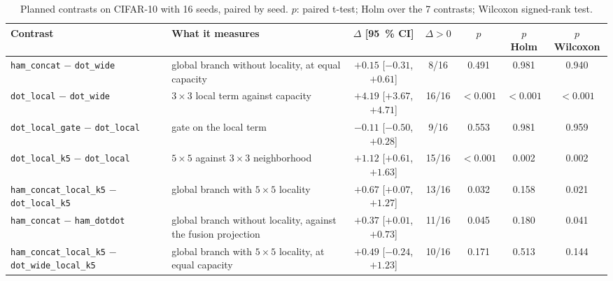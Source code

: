 
\begin{table}[!t]
\centering
\footnotesize
\caption{Planned contrasts on CIFAR-10 with 16 seeds, paired by seed. $p$: paired t-test; Holm over the 7 contrasts; Wilcoxon signed-rank test.}
\label{tab:contrastes}
\begin{adjustbox}{max width=\linewidth}
\begin{tabular}{>{\raggedright\arraybackslash}l>{\raggedright\arraybackslash}p{3.3cm}ccccc}
\toprule
Contrast & What it measures & $\Delta$ [95~\% CI] & $\Delta>0$ & $p$ & $p$ Holm & $p$ Wilcoxon \\
\midrule
\texttt{ham\_concat} $-$ \texttt{dot\_wide} & global branch without locality, at equal capacity & $+0.15$ [$-0.31$, $+0.61$] & 8/16 & 0.491 & 0.981 & 0.940 \\
\texttt{dot\_local} $-$ \texttt{dot\_wide} & $3\times3$ local term against capacity & $+4.19$ [$+3.67$, $+4.71$] & 16/16 & $<0.001$ & $<0.001$ & $<0.001$ \\
\texttt{dot\_local\_gate} $-$ \texttt{dot\_local} & gate on the local term & $-0.11$ [$-0.50$, $+0.28$] & 9/16 & 0.553 & 0.981 & 0.959 \\
\texttt{dot\_local\_k5} $-$ \texttt{dot\_local} & $5\times5$ against $3\times3$ neighborhood & $+1.12$ [$+0.61$, $+1.63$] & 15/16 & $<0.001$ & 0.002 & 0.002 \\
\texttt{ham\_concat\_local\_k5} $-$ \texttt{dot\_local\_k5} & global branch with $5\times5$ locality & $+0.67$ [$+0.07$, $+1.27$] & 13/16 & 0.032 & 0.158 & 0.021 \\
\texttt{ham\_concat} $-$ \texttt{ham\_dotdot} & global branch without locality, against the fusion projection & $+0.37$ [$+0.01$, $+0.73$] & 11/16 & 0.045 & 0.180 & 0.041 \\
\texttt{ham\_concat\_local\_k5} $-$ \texttt{dot\_wide\_local\_k5} & global branch with $5\times5$ locality, at equal capacity & $+0.49$ [$-0.24$, $+1.23$] & 10/16 & 0.171 & 0.513 & 0.144 \\
\bottomrule
\end{tabular}
\end{adjustbox}
\end{table}
